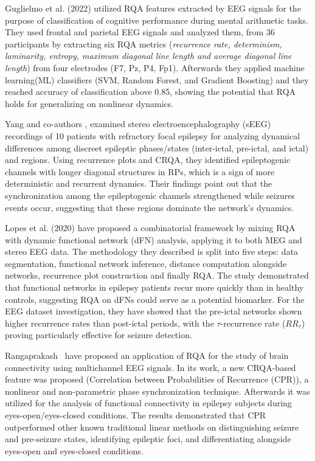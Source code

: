 \documentclass{article}
\begin{document}
			Guglielmo et al. (2022)\cite{guglielmo}  
			utilized RQA features extracted 
			by EEG signals for the purpose of classification
			of cognitive performance during mental arithmetic tasks. 
			They used frontal and parietal EEG signals 
			and analyzed them, from 36 participants by extracting 
			six RQA metrics (\textit{recurrence rate, determinism, 
			laminarity, entropy, maximum diagonal line length and average diagonal line length}) 
			from four electrodes (F7, Pz, P4, Fp1). 
			Afterwards they applied machine learning(ML) classifiers 
			(SVM, Random Forest, and Gradient Boosting) and
			they reached accuracy of classification above 0.85, 
			showing the potential that RQA holds for 
			generalizing on nonlinear dynamics.
			
			Yang and co-authors \cite{yang2019dynamical}, examined stereo electroencephalography (sEEG) 
			recordings of 10 patients with refractory focal epilepsy for analyzing dynamical differences 
			among discreet epileptic phases/states (inter-ictal, pre-ictal, and ictal) and regions. 
			Using recurrence plots and CRQA, they identified epileptogenic channels with longer diagonal
			structures in RPs, which is a sign of more deterministic and recurrent dynamics. 
			Their findings point out that the synchronization among the epileptogenic channels strengthened 
			while seizures events occur, suggesting that these regions dominate the 
			network's dynamics.


			Lopes et al. (2020)\cite{lopes} have proposed a 
			combinatorial framework 
			by mixing RQA with dynamic functional network (dFN) analysis,
			applying it to both MEG and stereo EEG data. 
			The methodology they described is split 
			into five steps: data segmentation, 
			functional network inference, distance computation alongside networks, 
			recurrence plot construction and finally RQA. 
			The study demonstrated that functional networks in epilepsy 
			patients recur more quickly than in healthy controls, suggesting RQA on
			dFNs could serve as a potential biomarker.
			For the EEG dataset investigation, they have showed that the pre-ictal 
			networks shown higher recurrence rates 
			than post-ictal periods, with the $\tau$-recurrence rate ($RR_{\tau}$) proving particularly 
			effective for seizure detection.
			
			Rangaprakash~\cite{rangaprakash2014} have proposed an application of RQA for the study of
			brain connectivity using multichannel EEG signals. In its work,
			a new CRQA-based feature was proposed (Correlation between 
			Probabilities of Recurrence (CPR)), a nonlinear and non-parametric 
			phase synchronization technique. Afterwards it was utilized for the analysis 
			of functional connectivity in epilepsy subjects during eyes-open/eyes-closed conditions.
			The results demonstrated that CPR outperformed other known traditional 
			linear methods on distinguishing seizure and pre-seizure states, 
			identifying epileptic foci, and differentiating alongside eyes-open and eyes-closed conditions. 
\end{document}
